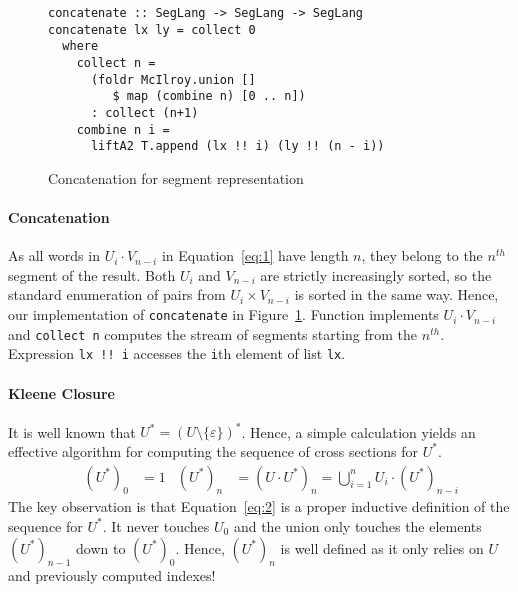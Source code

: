 \begin{figure}[tp]
\begin{lstlisting}
concatenate :: SegLang -> SegLang -> SegLang
concatenate lx ly = collect 0
  where
    collect n =
      (foldr McIlroy.union []
         $ map (combine n) [0 .. n])
      : collect (n+1)
    combine n i =
      liftA2 T.append (lx !! i) (ly !! (n - i))
\end{lstlisting}
\vspace{-\baselineskip}
  \caption{Concatenation for segment representation}
  \label{fig:concatenate-with-segments}
\end{figure}

\paragraph{Concatenation}
As all
words in $U_i \cdot V_{n-i}$ in Equation~\eqref{eq:1} have length $n$, they belong to the
$n^{th}$ segment of the result. Both $U_i$ and
$V_{n-i}$ are strictly increasingly sorted, so the standard enumeration of pairs from
$U_i \times
V_{n-i}$ is sorted in the same way. Hence, our implementation of
\lstinline{concatenate} in Figure~\ref{fig:concatenate-with-segments}.  Function  implements $U_i
\cdot V_{n-i}$ and  \lstinline{collect n} computes the stream of segments starting from
the $n^{th}$. Expression \lstinline{lx !! i} accesses the \lstinline{i}th element of
list \lstinline{lx}.  


\paragraph{Kleene Closure}
It is well known that $U^* = (U\setminus\{\varepsilon\})^*$. 
Hence, a simple calculation yields an
effective algorithm for computing the sequence of cross sections for $U^*$. 
\begin{align}
  \label{eq:2}
  &%
  & (U^*)_0 &= 1
  & (U^*)_n &= (U \cdot U^*)_n = \bigcup_{i=1}^n U_i\cdot (U^*)_{n-i}
\end{align}
The key observation is that Equation~\eqref{eq:2} is a proper
inductive definition of the sequence for $U^*$. It never touches $U_0$ and the union
only touches the elements $(U^*)_{n-1}$ down to $(U^*)_0$. Hence, $(U^*)_n$ is well
defined as it only relies on $U$ and previously computed indexes!

